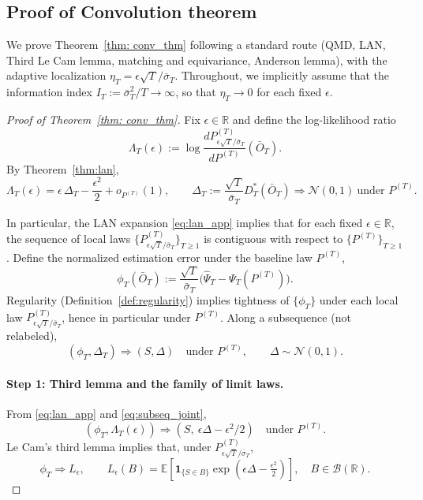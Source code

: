 \documentclass[11pt]{article}
\begin{document}
\subsection{Proof of Convolution theorem}
We prove Theorem~\ref{thm: conv_thm} following a standard route
(QMD, LAN, Third Le Cam lemma, matching and equivariance,
Anderson lemma), with the adaptive localization
$\eta_T=\epsilon\sqrt{T}/\bar\sigma_T$.
Throughout, we implicitly assume that the information index
$I_T:=\bar\sigma_T^2/T\to\infty$, so that $\eta_T\to0$ for each fixed
$\epsilon$.


\begin{proof}[Proof of Theorem~\ref{thm: conv_thm}]
Fix $\epsilon\in\mathbb R$ and define the log-likelihood ratio
\[
\Lambda_T(\epsilon)
:=
\log\frac{dP^{(T)}_{\epsilon\sqrt{T}/\bar\sigma_T}}{dP^{(T)}}(\bar O_T).
\]
By Theorem~\ref{thm:lan},
\begin{equation}\label{eq:lan_app}
\Lambda_T(\epsilon)
=
\epsilon\,\Delta_T-\frac{\epsilon^2}{2}+o_{P^{(T)}}(1),
\qquad
\Delta_T:=\frac{\sqrt{T}}{\bar\sigma_T}D_T^*(\bar O_T)
\Rightarrow \mathcal N(0,1)
\ \text{under }P^{(T)}.
\end{equation}

In particular, the LAN expansion \eqref{eq:lan_app} implies that for each
fixed $\epsilon\in\mathbb R$, the sequence of local laws
$\{P^{(T)}_{\epsilon\sqrt{T}/\bar\sigma_T}\}_{T\ge1}$ is contiguous with
respect to $\{P^{(T)}\}_{T\ge1}$. Define the normalized estimation error under the baseline law $P^{(T)}$,
\begin{equation}\label{eq:phiT_def}
\phi_T(\bar O_T)
:=
\frac{\sqrt{T}}{\bar\sigma_T}\Big(\hat\Psi_T-\Psi_T(P^{(T)})\Big).
\end{equation}
Regularity (Definition~\ref{def:regularity}) implies tightness of
$\{\phi_T\}$ under each local law $P^{(T)}_{\epsilon\sqrt{T}/\bar\sigma_T}$,
hence in particular under $P^{(T)}$. Along a subsequence (not relabeled),
\begin{equation}\label{eq:subseq_joint}
(\phi_T,\Delta_T)\Rightarrow(S,\Delta)
\quad\text{under }P^{(T)},
\qquad \Delta\sim\mathcal N(0,1).
\end{equation}

\paragraph{Step 1: Third lemma and the family of limit laws.}
From \eqref{eq:lan_app} and \eqref{eq:subseq_joint},
\[
(\phi_T,\Lambda_T(\epsilon))\Rightarrow (S,\ \epsilon\Delta-\epsilon^2/2)
\quad\text{under }P^{(T)}.
\]
Le Cam’s third lemma implies that, under $P^{(T)}_{\epsilon\sqrt{T}/\bar\sigma_T}$,
\begin{equation}\label{eq:limit_family}
\phi_T \Rightarrow L_\epsilon,
\qquad
L_\epsilon(B)
=
\mathbb E\!\left[
\mathbf 1_{\{S\in B\}}
\exp\!\left(\epsilon\Delta-\tfrac{\epsilon^2}{2}\right)
\right],
\quad B\in\mathcal B(\mathbb R).
\end{equation}


\end{proof}
\end{document}
